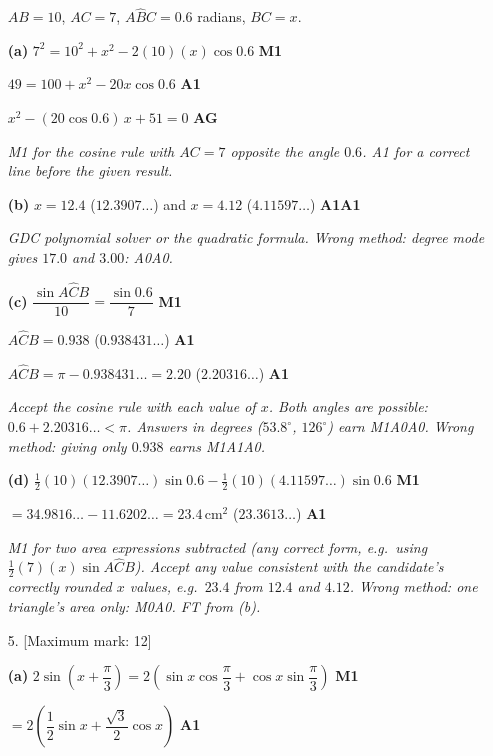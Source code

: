 \documentclass[12pt, twoside]{article}
\begin{document}
\begin{enumerate}[itemsep=0.3cm]
$AB = 10$, $AC = 7$, $A\hat{B}C = 0.6$ radians, $BC = x$.

\textbf{(a)} $7^{2} = 10^{2} + x^{2} - 2(10)(x)\cos 0.6$ \hfill \textbf{M1}

$49 = 100 + x^{2} - 20x\cos 0.6$ \hfill \textbf{A1}

$x^{2} - (20\cos 0.6)\,x + 51 = 0$ \hfill \textbf{AG}

\emph{M1 for the cosine rule with $AC = 7$ opposite the angle $0.6$. A1 for a
correct line before the given result.}

\textbf{(b)} $x = 12.4$ \quad ($12.3907\ldots$) \quad and \quad
$x = 4.12$ \quad ($4.11597\ldots$) \hfill \textbf{A1A1}

\emph{GDC polynomial solver or the quadratic formula. Wrong method: degree
mode gives $17.0$ and $3.00$: A0A0.}

\textbf{(c)} $\dfrac{\sin A\hat{C}B}{10} = \dfrac{\sin 0.6}{7}$ \hfill \textbf{M1}

$A\hat{C}B = 0.938$ \quad ($0.938431\ldots$) \hfill \textbf{A1}

$A\hat{C}B = \pi - 0.938431\ldots = 2.20$ \quad ($2.20316\ldots$)
\hfill \textbf{A1}

\emph{Accept the cosine rule with each value of $x$. Both angles are
possible: $0.6 + 2.20316\ldots < \pi$. Answers in degrees ($53.8^\circ$,
$126^\circ$) earn M1A0A0. Wrong method: giving only $0.938$ earns M1A1A0.}

\textbf{(d)} $\frac{1}{2}(10)(12.3907\ldots)\sin 0.6 - \frac{1}{2}(10)(4.11597\ldots)\sin 0.6$
\hfill \textbf{M1}

$= 34.9816\ldots - 11.6202\ldots = 23.4\,\text{cm}^{2}$ \quad ($23.3613\ldots$)
\hfill \textbf{A1}

\emph{M1 for two area expressions subtracted (any correct form, e.g.\ using
$\frac{1}{2}(7)(x)\sin A\hat{C}B$). Accept any value consistent with the
candidate's correctly rounded $x$ values, e.g.\ $23.4$ from $12.4$ and
$4.12$. Wrong method: one triangle's area only: M0A0. FT from (b).}

\newpage

\item[5.] [Maximum mark: 12]

\textbf{(a)} $2\sin\left(x + \dfrac{\pi}{3}\right)
= 2\left(\sin x\cos\dfrac{\pi}{3} + \cos x\sin\dfrac{\pi}{3}\right)$
\hfill \textbf{M1}

$= 2\left(\dfrac{1}{2}\sin x + \dfrac{\sqrt{3}}{2}\cos x\right)$
\hfill \textbf{A1}


\end{enumerate}
\end{document}
